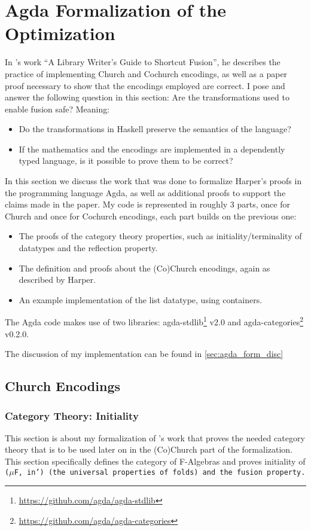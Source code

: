 \section{Agda Formalization of the Optimization}\label{sec:formalization}
In \cite{Harper2011}'s work ``A Library Writer's Guide to Shortcut Fusion'', he describes the practice of implementing Church and Cochurch encodings, as well as a paper proof necessary to show that the encodings employed are correct.
I pose and answer the following question in this section:
Are the transformations used to enable fusion safe? Meaning:
\begin{itemize}[noitemsep]
  \item Do the transformations in Haskell preserve the semantics of the language?
  \item If the mathematics and the encodings are implemented in a dependently typed language, is it possible to prove them to be correct?
\end{itemize}

In this section we discuss the work that was done to formalize Harper's proofs in the programming language Agda, as well as additional proofs to support the claims made in the paper.
My code is represented in roughly 3 parts, once for Church and once for Cochurch encodings, each part builds on the previous one:
\begin{itemize}[noitemsep]
  \item The proofs of the category theory properties, such as initiality/terminality of datatypes and the reflection property.
  \item The definition and proofs about the (Co)Church encodings, again as described by Harper.
  \item An example implementation of the list datatype, using containers.
\end{itemize}

The Agda code makes use of two libraries: agda-stdlib\footnote{\url{https://github.com/agda/agda-stdlib}} v2.0 and agda-categories\footnote{\url{https://github.com/agda/agda-categories}} v0.2.0.

The discussion of my implementation can be found in \autoref{sec:agda_form_disc}


\subsection{Church Encodings}
\subsubsection{Category Theory: Initiality}\label{sec:agda_init}
This section is about my formalization of \cite{Harper2011}'s work that proves the needed category theory that is to be used later on in the (Co)Church part of the formalization.
This section specifically defines the category of F-Algebras and proves initiality of \tt($\mu$F, in') (the universal properties of folds) and the fusion property.



